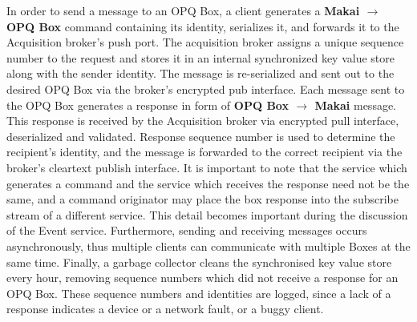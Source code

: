 In order to send a message to an OPQ Box, a client generates a \textbf{Makai $\rightarrow$ OPQ Box} command containing its identity, serializes it, and forwards it to the Acquisition broker's push port.
The acquisition broker assigns a unique sequence number to the request and stores it in an internal synchronized key value store along with the sender identity.
The message is re-serialized and sent out to the desired OPQ Box via the broker's encrypted pub interface.
Each message sent to the OPQ Box generates a response in form of \textbf{OPQ Box $\rightarrow$ Makai} message.
This response is received by the Acquisition broker via encrypted pull interface, deserialized and validated.
Response sequence number is used to determine the recipient's identity, and the message is forwarded to the correct recipient via the broker's cleartext publish interface.
It is important to note that the service which generates a command and the service which receives the response need not be the same, and a command originator may place the box response into the subscribe stream of a different service.
This detail becomes important during the discussion of the Event service.
Furthermore, sending and receiving messages occurs asynchronously, thus multiple clients can communicate with multiple Boxes at the same time.
Finally, a garbage collector cleans the synchronised key value store every hour, removing sequence numbers which did not receive a response for an OPQ Box.
These sequence numbers and identities are logged, since a lack of a response indicates a device or a network fault, or a buggy client.

